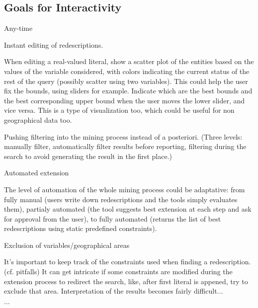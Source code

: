 \subsection{Goals for Interactivity}
\label{sec:goals-interaction}

Any-time

Instant editing of redescriptions.

When editing a real-valued literal, show a scatter plot of the
entities based on the values of the variable considered, with colors
indicating the current status of the rest of the query (possibly
scatter using two variables). This could help the user fix the bounds,
using sliders for example.  Indicate which are the best bounds and the
best corresponding upper bound when the user moves the lower slider,
and vice versa.  This is a type of visualization too, which could be
useful for non geographical data too.

Pushing filtering into the mining process instead of a
posteriori. (Three levels: manually filter, automatically filter
results before reporting, filtering during the search to avoid
generating the result in the first place.)

Automated extension

The level of automation of the whole mining process could be adaptative: from fully manual (users write down redescriptions and the tools simply evaluates them), partialy automated (the tool suggests best extension at each step and ask for approval from the user), to fully automated (returns the list of best redescriptions using static predefined constraints).

Exclusion of variables/geographical areas

It's important to keep track of the constraints used when finding a
redescription. (cf. pitfalls) It can get intricate if some constraints
are modified during the extension process to redirect the search, like, after first literal is appened, try to exclude that area. Interpretation of the results becomes fairly difficult...

$\ldots$

